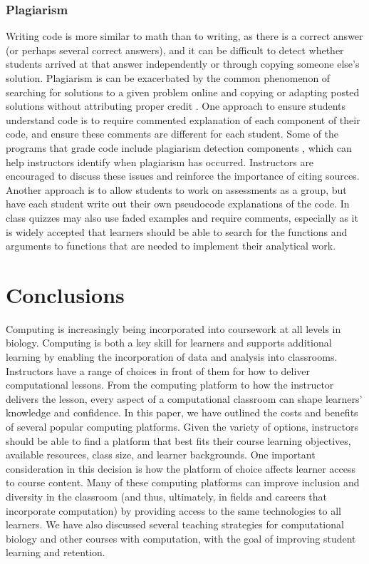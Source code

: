 \subsubsection{Plagiarism}
Writing code is more similar to math than to writing, as there is a correct answer (or perhaps several correct answers), and it can be difficult to detect whether students arrived at that answer independently or through copying someone else's solution.
Plagiarism is can be exacerbated by the common phenomenon of searching for solutions to a given problem online and copying or adapting posted solutions without attributing proper credit \citep{gaspar_restoring_2007}. 
One approach to ensure students understand code is to require commented explanation of each component of their code, and ensure these comments are different for each student.
Some of the programs that grade code include plagiarism detection components \citep{pears_survey_2007}, which can help instructors identify when plagiarism has occurred.
Instructors are encouraged to discuss these issues and reinforce the importance of citing sources.
Another approach is to allow students to work on assessments as a group, but have each student write out their own pseudocode explanations of the code.
In class quizzes may also use faded examples and require comments,
especially as it is widely accepted that learners should be able to search for the functions
and arguments to functions that are needed to implement their analytical work.

\section{Conclusions}

Computing is increasingly being incorporated into coursework at all levels in biology.
Computing is both a key skill for learners and supports additional learning by enabling the incorporation of data and analysis into classrooms. 
Instructors have a range of choices in front of them for how to deliver computational lessons.
From the computing platform to how the instructor delivers the lesson, every aspect of a computational classroom can shape learners' knowledge and confidence. 
In this paper, we have outlined the costs and benefits of several popular computing platforms.
Given the variety of options, instructors should be able to find a platform that best fits their course learning objectives, available resources, class size, and learner backgrounds.
One important consideration in this decision is how the platform of choice affects learner access to course content.
Many of these computing platforms can improve inclusion and diversity in the classroom (and thus, ultimately, in fields and careers that incorporate computation) by providing access to the same technologies to all learners.
We have also discussed several teaching strategies for computational biology and other courses with computation, with the goal of improving student learning and retention.

